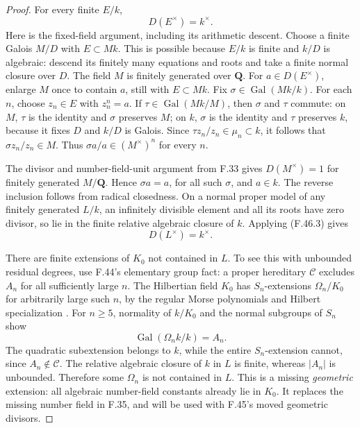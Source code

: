 \begin{proof}
For every finite \(E/k\),
\[
                  D(E^\times)=k^\times.                   \tag{F.46.3}
\]
Here is the fixed-field argument, including its arithmetic descent.
Choose a finite Galois \(M/D\) with \(E\subset Mk\). This is possible
because \(E/k\) is finite and \(k/D\) is algebraic: descend its finitely
many equations and roots and take a finite normal closure over \(D\).
The field \(M\) is finitely generated over \(\mathbf Q\).
For \(a\in D(E^\times)\), enlarge \(M\) once to contain \(a\), still
with \(E\subset Mk\). Fix
\(\sigma\in\operatorname{Gal}(Mk/k)\). For each \(n\), choose
\(z_n\in E\) with \(z_n^n=a\). If
\(\tau\in\operatorname{Gal}(Mk/M)\), then \(\sigma\) and \(\tau\)
commute: on \(M\), \(\tau\) is the identity and \(\sigma\) preserves
\(M\); on \(k\), \(\sigma\) is the identity and \(\tau\) preserves
\(k\), because it fixes \(D\) and \(k/D\) is Galois. Since
\(\tau z_n/z_n\in\mu_n\subset k\), it follows that
\(\sigma z_n/z_n\in M\). Thus
\(\sigma a/a\in(M^\times)^n\) for every \(n\).

The divisor and number-field-unit argument from F.33 gives
\(D(M^\times)=1\) for finitely generated \(M/\mathbf Q\). Hence
\(\sigma a=a\), for all such \(\sigma\), and \(a\in k\). The
reverse inclusion follows from radical closedness. On a normal proper
model of any finitely generated \(L/k\), an infinitely divisible element
and all its roots have zero divisor, so lie in the finite relative
algebraic closure of \(k\). Applying \textup{(F.46.3)} gives
\[
                         D(L^\times)=k^\times.             \tag{F.46.4}
\]

There are finite extensions of \(K_0\) not contained in \(L\). To see
this with unbounded residual degrees, use F.44's elementary group fact:
a proper hereditary \(\mathcal C\) excludes \(A_n\) for all sufficiently
large \(n\). The Hilbertian field \(K_0\) has \(S_n\)-extensions
\(\Omega_n/K_0\) for arbitrarily large such \(n\), by the regular Morse
polynomials and Hilbert specialization \citep[Theorem~4.4.1 and Proposition~3.3.1]{F_Serre2007}. For \(n\ge5\), normality of
\(k/K_0\) and the normal subgroups of \(S_n\) show
\[
 \operatorname{Gal}(\Omega_nk/k)=A_n.                       \tag{F.46.5}
\]
The quadratic subextension belongs to \(k\), while the entire
\(S_n\)-extension cannot, since \(A_n\notin\mathcal C\).
The relative algebraic closure of \(k\) in \(L\) is finite, whereas
\(|A_n|\) is unbounded. Therefore some \(\Omega_n\) is not contained
in \(L\). This is a missing \emph{geometric} extension: all algebraic
number-field constants already lie in \(K_0\). It replaces the missing
number field in F.35, and will be used with F.45's moved geometric
divisors.


\end{proof}
